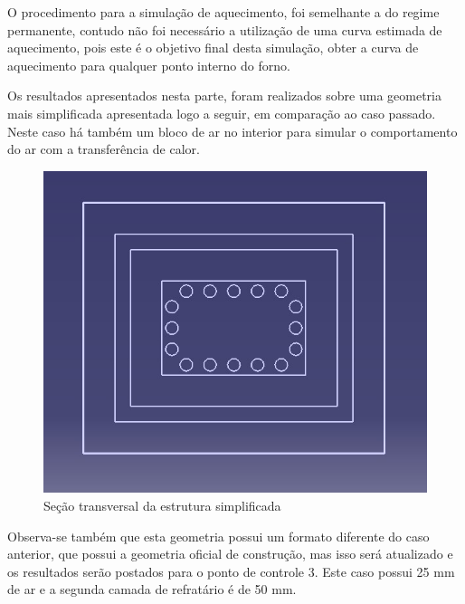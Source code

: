 O procedimento para a simulação de aquecimento, foi semelhante a do regime
permanente, contudo não foi necessário a utilização de uma curva estimada de
aquecimento, pois este é o objetivo final desta simulação, obter a curva de aquecimento
para qualquer ponto interno do forno.

Os resultados apresentados nesta parte, foram realizados sobre uma geometria mais
simplificada apresentada logo a seguir, em comparação ao caso passado. Neste caso há
também um bloco de ar no interior para simular o comportamento do ar com a
transferência de calor.
\begin{figure}[H]
	\centering
	\label{ansys11}
	\includegraphics[keepaspectratio=true,scale=0.8]{figuras/ansys11.jpg}
    \caption{Seção transversal da estrutura simplificada}
\end{figure}

Observa-se também que esta geometria possui um formato diferente do caso
anterior, que possui a geometria oficial de construção, mas isso será atualizado e os
resultados serão postados para o ponto de controle 3. Este caso possui 25 mm de ar e a
segunda camada de refratário é de 50 mm.

